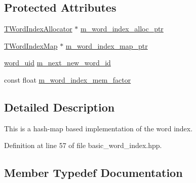 \subsection*{Protected Attributes}
\begin{DoxyCompactItemize}
\item 
\hyperlink{classuva_1_1smt_1_1bpbd_1_1server_1_1lm_1_1dictionary_1_1basic__word__index_a056edf8ef4a61b1cfde2f2269437f6d5}{T\+Word\+Index\+Allocator} $\ast$ \hyperlink{classuva_1_1smt_1_1bpbd_1_1server_1_1lm_1_1dictionary_1_1basic__word__index_acbd75f75b5ba0115573b24273e901e03}{m\+\_\+word\+\_\+index\+\_\+alloc\+\_\+ptr}
\item 
\hyperlink{classuva_1_1smt_1_1bpbd_1_1server_1_1lm_1_1dictionary_1_1basic__word__index_ab58bffa80202cb71ba13ba19814b622c}{T\+Word\+Index\+Map} $\ast$ \hyperlink{classuva_1_1smt_1_1bpbd_1_1server_1_1lm_1_1dictionary_1_1basic__word__index_afc879e3d774df5b009385c5e6f466438}{m\+\_\+word\+\_\+index\+\_\+map\+\_\+ptr}
\item 
\hyperlink{namespaceuva_1_1smt_1_1bpbd_1_1server_a6bfe45ba344d65a7fdd7d26156328ddc}{word\+\_\+uid} \hyperlink{classuva_1_1smt_1_1bpbd_1_1server_1_1lm_1_1dictionary_1_1basic__word__index_a9ca20f562bff53f7596e15d0f884e0c8}{m\+\_\+next\+\_\+new\+\_\+word\+\_\+id}
\item 
const float \hyperlink{classuva_1_1smt_1_1bpbd_1_1server_1_1lm_1_1dictionary_1_1basic__word__index_aa1c113ede28b36600842da1f8a4652f5}{m\+\_\+word\+\_\+index\+\_\+mem\+\_\+factor}
\end{DoxyCompactItemize}


\subsection{Detailed Description}
This is a hash-\/map based implementation of the word index. 

Definition at line 57 of file basic\+\_\+word\+\_\+index.\+hpp.



\subsection{Member Typedef Documentation}
\hypertarget{classuva_1_1smt_1_1bpbd_1_1server_1_1lm_1_1dictionary_1_1basic__word__index_a056edf8ef4a61b1cfde2f2269437f6d5}{}
